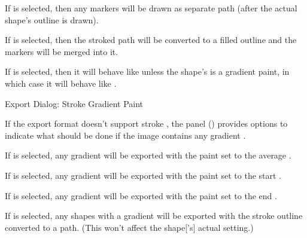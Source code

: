 
If  is selected, then any markers
will be drawn as separate path (after the actual shape's outline is
drawn).


If  is selected, then the stroked
path will be converted to a filled outline and the markers will be
merged into it.


If  is selected, then it
will behave like  unless the shape's
 is a gradient paint, in which case it will
behave like .


 {}
 {Export Dialog: Stroke Gradient Paint}

If the export format doesn't support stroke , 
the  panel
() provides options to indicate
what should be done if the image contains any gradient
.


If  is selected, any gradient
 will be exported with the paint set to the
average .


If  is selected, any gradient
 will be exported with the paint set to
the start .


If  is selected, any gradient
 will be exported with the paint set to
the end .


If  is selected, any
\glspl{shape} with a gradient  will be exported
with the stroke outline converted to a path.
(This won't affect the \gls{shape}['s] actual  setting.)

